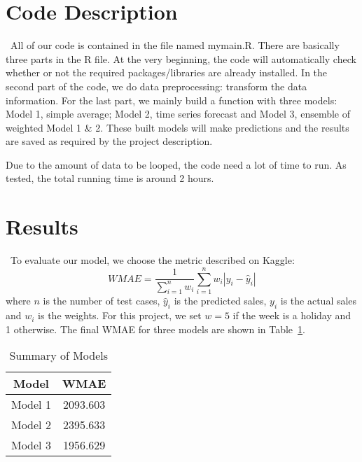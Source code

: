 \documentclass[12pt]{article}
\begin{document}
\section{Code Description}
\quad\ All of our code is contained in the file named mymain.R. 
There are basically three parts in the R file. At the very beginning, the code will automatically check whether or not the required packages/libraries are already installed. In the second part of the code, we do data preprocessing: transform the data information. For the last part, we mainly build a function with three models: Model 1, simple average;  Model 2, time series forecast and Model 3, ensemble of weighted Model 1 \& 2. These built models will make predictions and the results are saved as required by the project description.

Due to the amount of data to be looped, the code need a lot of time to run. As tested, the total running time is around 2 hours.

\section{Results}
\quad\ To evaluate our model, we choose the metric described on Kaggle:
\begin{equation}
WMAE = \frac{1}{\sum_{i=1}^n w_i} \sum_{i=1}^n w_i | y_i - \hat{y}_i |
\end{equation}
where $n$ is the number of test cases, $\hat{y}_i$ is the predicted sales, $y_i$ is the actual sales and $w_i$ is the weights. For this project, we set $w=5$ if the week is a holiday and 1 otherwise. The final WMAE for three models are shown in Table~\ref{result}.

\begin{table}[htb]
 \caption{Summary of Models} \label{result}
 \vspace{0.1in}
\begin{center}
  \begin{tabular}{  c  c  }
  
    \hline
    Model          &WMAE     \\ \hline
    Model 1         & 2093.603    \\ \hline
    Model 2         & 2395.633    \\ \hline
    Model 3         & 1956.629    \\ \hline
  \end{tabular}
\end{center}
\end{table}
\end{document}
